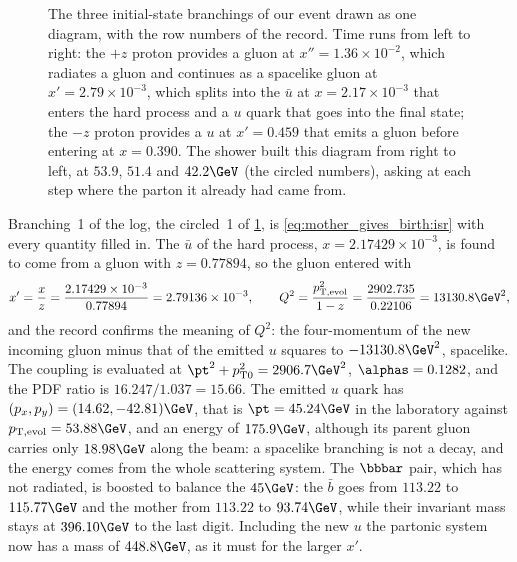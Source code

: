 \begin{figure}[htbp]\centering
\resizebox{\textwidth}{!}{}
\caption[The initial-state branchings of our event as a diagram]{The three
initial-state branchings of our event drawn as one diagram, with the row
numbers of the record. Time runs from left to right: the $+z$ proton
provides a gluon at $x''=1.36\times10^{-2}$, which radiates a gluon and
continues as a spacelike gluon at $x'=2.79\times10^{-3}$, which splits into
the $\bar u$ at $x=2.17\times10^{-3}$ that enters the hard process and a $u$
quark that goes into the final state; the $-z$ proton provides a $u$ at
$x'=0.459$ that emits a gluon before entering at $x=0.390$. The shower
built this diagram from right to left, at $53.9$, $51.4$ and $42.2\GeV$
(the circled numbers), asking at each step where the parton it already had
came from.}
\label{fig:mother_gives_birth:isr_diagram}
\end{figure}

Branching~1 of the log, the circled~1 of
\cref{fig:mother_gives_birth:isr_diagram}, is \cref{eq:mother_gives_birth:isr}
with every quantity filled in. The $\bar u$ of the hard process, $x=2.17429\times10^{-3}$,
is found to come from a gluon with $z=0.77894$, so the gluon entered with
\begin{equation*}
  x'=\frac{x}{z}=\frac{2.17429\times10^{-3}}{0.77894}=2.79136\times10^{-3},
  \qquad
  Q^2=\frac{\ptevol^2}{1-z}=\frac{2902.735}{0.22106}=13130.8\GeV^2 ,
\end{equation*}
and the record confirms the meaning of $Q^2$: the four-momentum of the
new incoming gluon minus that of the emitted $u$ squares to
$-13130.8\GeV^2$, spacelike. The coupling is evaluated at
$\pt^2+p_{\mathrm{T}0}^2=2906.7\GeV^2$, $\alphas=0.1282$, and the PDF
ratio is $16.247/1.037=15.66$. The emitted $u$ quark has
$(p_x,p_y)=(14.62,-42.81)\GeV$, that is $\pt=45.24\GeV$ in the
laboratory against $\ptevol=53.88\GeV$, and an energy of $175.9\GeV$,
although its parent gluon carries only $18.98\GeV$ along the beam: a
spacelike branching is not a decay, and the energy comes from the whole
scattering system. The $\bbbar$ pair, which has not radiated, is boosted
to balance the $45\GeV$: the $\bar b$ goes from $113.22$ to $115.77\GeV$
and the mother from $113.22$ to $93.74\GeV$, while their invariant mass
stays at $396.10\GeV$ to the last digit. Including the new $u$ the
partonic system now has a mass of $448.8\GeV$, as it must for the larger
$x'$.

